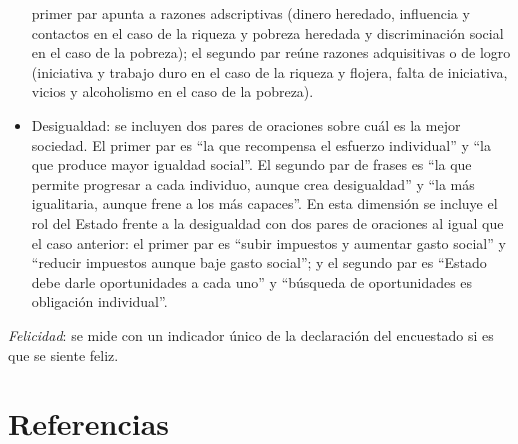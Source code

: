 \documentclass[
  12pt,
]{book}
\begin{document}
\begin{itemize}
  primer par apunta a razones adscriptivas (dinero heredado,
  influencia y contactos en el caso de la riqueza y pobreza heredada y
  discriminación social en el caso de la pobreza); el segundo par
  reúne razones adquisitivas o de logro (iniciativa y trabajo duro en
  el caso de la riqueza y flojera, falta de iniciativa, vicios y
  alcoholismo en el caso de la pobreza).
\item
  Desigualdad: se incluyen dos pares de oraciones sobre cuál es la
  mejor sociedad. El primer par es ``la que recompensa el esfuerzo
  individual'' y ``la que produce mayor igualdad social''. El segundo par
  de frases es ``la que permite progresar a cada individuo, aunque crea
  desigualdad'' y ``la más igualitaria, aunque frene a los más capaces''.
  En esta dimensión se incluye el rol del Estado frente a la
  desigualdad con dos pares de oraciones al igual que el caso
  anterior: el primer par es ``subir impuestos y aumentar gasto social''
  y ``reducir impuestos aunque baje gasto social''; y el segundo par es
  ``Estado debe darle oportunidades a cada uno'' y ``búsqueda de
  oportunidades es obligación individual''.
\end{itemize}

\emph{Felicidad}: se mide con un indicador único de la declaración del
encuestado si es que se siente feliz.

\hypertarget{referencias}{%
\section{Referencias}\label{referencias}}
\end{document}
